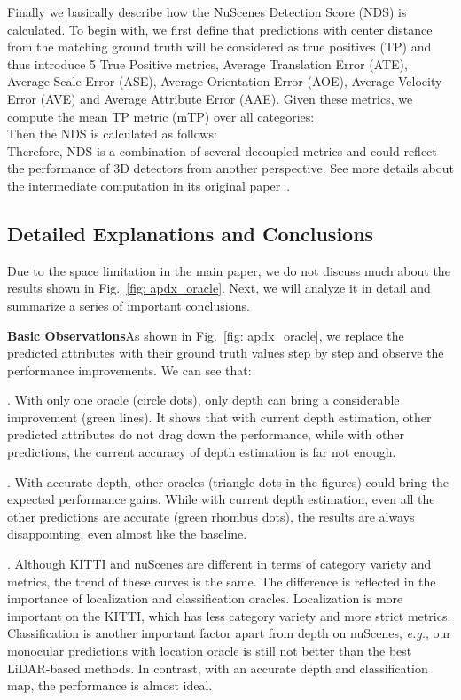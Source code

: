 Finally we basically describe how the NuScenes Detection Score (NDS) is calculated. To begin with, we first define that predictions with center distance from the matching ground truth  will be considered as true positives (TP) and thus introduce 5 True Positive metrics, Average Translation Error (ATE), Average Scale Error (ASE), Average Orientation Error (AOE), Average Velocity Error (AVE) and Average Attribute Error (AAE). Given these metrics, we compute the mean TP metric (mTP) over all categories:\\
 
Then the NDS is calculated as follows:\\

Therefore, NDS is a combination of several decoupled metrics and could reflect the performance of 3D detectors from another perspective. See more details about the intermediate computation in its original paper~\cite{nuScenes}.

\subsection{Detailed Explanations and Conclusions}
Due to the space limitation in the main paper, we do not discuss much about the results shown in Fig.~\ref{fig: apdx_oracle}. Next, we will analyze it in detail and summarize a series of important conclusions.

\noindent\textbf{Basic Observations}\quad As shown in Fig.~\ref{fig: apdx_oracle}, we replace the predicted attributes with their ground truth values step by step and observe the performance improvements. We can see that:

. With only one oracle (circle dots), only depth can bring a considerable improvement (green lines). It shows that with current depth estimation, other predicted attributes do not drag down the performance, while with other predictions, the current accuracy of depth estimation is far not enough.

. With accurate depth, other oracles (triangle dots in the figures) could bring the expected performance gains. While with current depth estimation, even all the other predictions are accurate (green rhombus dots), the results are always disappointing, even almost like the baseline.

. Although KITTI and nuScenes are different in terms of category variety and metrics, the trend of these curves is the same. The difference is reflected in the importance of localization and classification oracles. Localization is more important on the KITTI, which has less category variety and more strict metrics. Classification is another important factor apart from depth on nuScenes, \emph{e.g.}, our monocular predictions with location oracle is still not better than the best LiDAR-based methods. In contrast, with an accurate depth and classification map, the performance is almost ideal.


